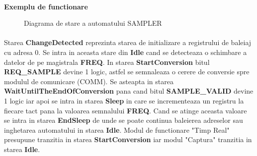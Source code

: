 \paragraph{}
\textbf{Exemplu de functionare}

\begin{figure}[h]
\centering
\setlength\fboxsep{0pt}
\setlength\fboxrule{0.5pt}
\label{fig:waveform-SAMPLER1}
\end{figure}


\begin{figure}[h]
\centering
\setlength\fboxsep{0pt}
\setlength\fboxrule{0.5pt}
\label{fig:waveform-SAMPLER2}
\end{figure}

\begin{figure}[h]
\centering
\setlength\fboxsep{0pt}
\setlength\fboxrule{0.5pt}
\label{fig:waveform-SAMPLER3}
\end{figure}


\clearpage
\begin{figure}[h]
\centering
\setlength\fboxsep{0pt}
\setlength\fboxrule{0.5pt}
\caption{Diagrama de stare a automatului SAMPLER}
\label{fig:SAMPLER-automata}
\end{figure}



\paragraph{}
Starea \textbf{ChangeDetected} reprezinta starea de initializare a registrului de baleiaj cu adresa 0. Se intra in aceasta stare din \textbf{Idle} cand se detecteaza o schimbare a datelor de pe magistrala \textbf{FREQ}. In starea \textbf{StartConversion} bitul \textbf{REQ\_SAMPLE} devine 1 logic, astfel se semnaleaza o cerere de conversie spre modulul de comunicare (COMM). Se asteapta in starea \textbf{WaitUntilTheEndOfConversion} pana cand bitul \textbf{SAMPLE\_VALID} devine 1 logic iar apoi se intra in starea \textbf{Sleep} in care se incrementeaza un registru la fiecare tact pana la valoarea semnalului \textbf{FREQ}. Cand se atinge aceasta valoare se intra in starea \textbf{EndSleep} de unde se poate continua baleierea adreselor sau inghetarea automatului in starea \textbf{Idle}. Modul de functionare "Timp Real" presupune tranzitia in starea \textbf{StartConversion} iar modul "Captura" tranzitia in starea \textbf{Idle}.


